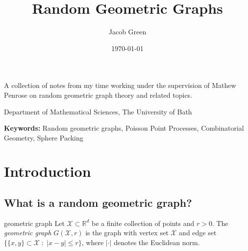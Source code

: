 \documentclass{article}
\title{Random Geometric Graphs}
\author{Jacob Green}
\date{\today}
\newcommand{\subtitle}{A collection of notes from my time working under the supervision of Mathew Penrose on 
random geometric graph theory and related topics.}
\newcommand{\institution}{Department of Mathematical Sciences, The University of Bath}
\newcommand{\keywords}{Random geometric graphs, Poisson Point Processes, Combinatorial Geometry, Sphere Packing}
\newcounter{definitioncount} %
\newcounter{lemmacount}
\newcounter{examplecount}
\newcounter{theoremcount}
\newcounter{propositioncount}
\newcounter{corollarycount}
\newcounter{remarkcount}
\begin{document}
\begin{titlepage}
    \centering
    
    {\Huge \bfseries \thetitle \par}
    \vspace{0.5cm}
    
    {\Large \subtitle \par}
    \vspace{1cm}
    
    {\large \theauthor \par}
    {\institution \par}
    \vspace{1cm}
    
    {\large \thedate \par}
    \vspace{1.5cm}
    
    \begin{abstract}
        \lipsum[10]
    \end{abstract}
    \vspace{1cm}
    
    \textbf{Keywords:} \keywords
    \vfill %
    
    \textit{}
\end{titlepage}

\newpage

\tableofcontents 

\newpage 

\setcounter{page}{1} %

\section{Introduction}

\setcounter{lemmacount}{1}
\setcounter{examplecount}{1}
\setcounter{theoremcount}{1}
\setcounter{propositioncount}{1}
\setcounter{corollarycount}{1}
\setcounter{remarkcount}{1}
\setcounter{definitioncount}{1}

\subsection{What is a random geometric graph?}

\begin{definition}[]{geometric graph}
    Let $\mathcal{X} \subset \mathbb{R}^d$ be a finite collection of points and $r > 0$. The {\it geometric graph}
    $G(\mathcal{X}, r)$ is the graph with vertex set $\mathcal{X}$ and edge set $\{\{x, y\} \subset \mathcal{X} 
    \; : \; \lvert x - y \rvert \leq r\}$, where $\lvert \cdot \rvert$ denotes the Euclidean norm. 
\end{definition}
\end{document}
